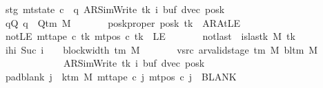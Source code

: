 \begin{isabellebody}
\ \ \ \ \ \ \ stg{\isacharcolon}{\kern0pt}\ {\isachardoublequoteopen}mt{\isacharunderscore}{\kern0pt}state\ c{\isacharprime}{\kern0pt}\ {\isacharequal}{\kern0pt}\ {\isacharparenleft}{\kern0pt}q{\isacharcomma}{\kern0pt}\ AR{\isacharunderscore}{\kern0pt}SimWrite{\isacharcomma}{\kern0pt}\ tk{\isacharcomma}{\kern0pt}\ i{\isacharcomma}{\kern0pt}\ buf{\isacharcomma}{\kern0pt}\ dvec{\isacharcomma}{\kern0pt}\ posk{\isacharparenright}{\kern0pt}{\isachardoublequoteclose}\isanewline
\ \ \ \ \ \ \ qQ{\isacharcolon}{\kern0pt}\ {\isachardoublequoteopen}q\ {\isasymin}\ Q{\isacharunderscore}{\kern0pt}tm\ M{\isachardoublequoteclose}\isanewline
\ \ \ \ \ \ \ poskproper{\isacharcolon}{\kern0pt}\ {\isachardoublequoteopen}posk\ tk\ {\isasymnoteq}\ AR{\isacharunderscore}{\kern0pt}AtLE{\isachardoublequoteclose}\isanewline
\ \ \ \ \ \ \ notLE{\isacharcolon}{\kern0pt}\ {\isachardoublequoteopen}mt{\isacharunderscore}{\kern0pt}tape\ c{\isacharprime}{\kern0pt}\ tk\ {\isacharparenleft}{\kern0pt}mt{\isacharunderscore}{\kern0pt}pos\ c{\isacharprime}{\kern0pt}\ tk{\isacharparenright}{\kern0pt}\ {\isasymnoteq}\ LE{}{\isachardoublequoteclose}\isanewline
\ \ \ \ \ \ \ notlast{\isacharcolon}{\kern0pt}\ {\isachardoublequoteopen}{\isasymnot}\ is{\isacharunderscore}{\kern0pt}last{\isacharunderscore}{\kern0pt}k\ M\ tk{\isachardoublequoteclose}\isanewline
\ \ \ \ \ \ \ ihi{\isacharcolon}{\kern0pt}\ {\isachardoublequoteopen}Suc\ i\ {\isacharequal}{\kern0pt}\ {}\ {\isacharasterisk}{\kern0pt}\ block{\isacharunderscore}{\kern0pt}width\ {\isacharparenleft}{\kern0pt}{\isasymGamma}{\isacharunderscore}{\kern0pt}tm\ M{\isacharparenright}{\kern0pt}{\isachardoublequoteclose}\isanewline
\ \ \ \ \ \ \ vsrc{\isacharcolon}{\kern0pt}\ {\isachardoublequoteopen}ar{\isacharunderscore}{\kern0pt}valid{\isacharunderscore}{\kern0pt}stage\ {\isacharparenleft}{\kern0pt}{\isasymGamma}{\isacharunderscore}{\kern0pt}tm\ M{\isacharparenright}{\kern0pt}\ {\isacharparenleft}{\kern0pt}bl{\isacharunderscore}{\kern0pt}tm\ M{\isacharparenright}{\kern0pt}\isanewline
\ \ \ \ \ \ \ \ \ \ \ \ \ \ \ \ \ \ \ {\isacharparenleft}{\kern0pt}AR{\isacharunderscore}{\kern0pt}SimWrite{\isacharcomma}{\kern0pt}\ tk{\isacharcomma}{\kern0pt}\ i{\isacharcomma}{\kern0pt}\ buf{\isacharcomma}{\kern0pt}\ dvec{\isacharcomma}{\kern0pt}\ posk{\isacharparenright}{\kern0pt}{\isachardoublequoteclose}\isanewline
\ \ \ \ \ \ \ pad{\isacharunderscore}{\kern0pt}blank{\isacharcolon}{\kern0pt}\ {\isachardoublequoteopen}{\isasymforall}j\ {\isasymge}\ k{\isacharunderscore}{\kern0pt}tm\ M{\isachardot}{\kern0pt}\ mt{\isacharunderscore}{\kern0pt}tape\ c{\isacharprime}{\kern0pt}\ j\ {\isacharparenleft}{\kern0pt}mt{\isacharunderscore}{\kern0pt}pos\ c{\isacharprime}{\kern0pt}\ j{\isacharparenright}{\kern0pt}\ {\isacharequal}{\kern0pt}\ BLANK{}{\isachardoublequoteclose}\isanewline

\end{isabellebody}
